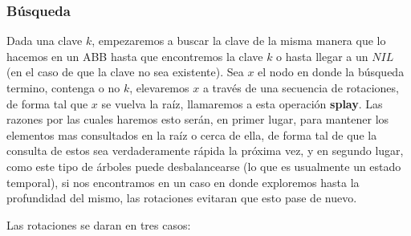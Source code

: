 \subsubsection{B\'usqueda}

Dada una clave $k$, empezaremos a buscar la clave de la misma manera que lo hacemos en un ABB hasta que encontremos la clave $k$ o hasta llegar a un $NIL$ (en el caso de que la clave no sea existente). Sea $x$ el nodo en donde la b\'usqueda termino, contenga o no $k$, elevaremos $x$ a trav\'es de una secuencia de rotaciones, de forma tal que $x$ se vuelva la ra\'iz, llamaremos a esta operaci\'on \textbf{splay}. Las razones por las cuales haremos esto ser\'an, en primer lugar, para mantener los elementos mas consultados en la ra\'iz o cerca de ella, de forma tal de que la consulta de estos sea verdaderamente r\'apida la pr\'oxima vez, y en segundo lugar, como este tipo de \'arboles puede desbalancearse (lo que es usualmente un estado temporal), si nos encontramos en un caso en donde exploremos hasta la profundidad del mismo, las rotaciones evitaran que esto pase de nuevo.

\newpage

Las rotaciones se daran en tres casos:

